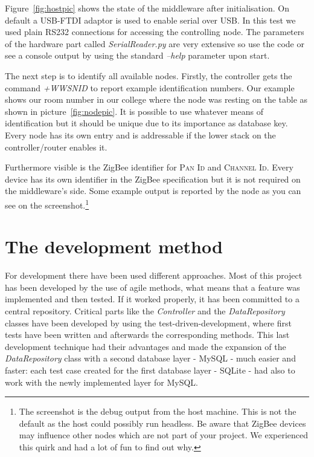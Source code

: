 Figure~\ref{fig:hostpic} shows the state of the middleware after initialisation. On default a USB-FTDI adaptor is used to enable serial over USB.
In this test we used plain RS232 connections for accessing the controlling node. The parameters of the hardware part called \textit{SerialReader.py}
are very extensive so use the code or see a console output by using the standard \textit{--help} parameter upon start.

The next step is to identify all available nodes. Firstly, the controller gets the command \textit{+WWSNID} to report example identification numbers.
Our example shows our room number in our college where the node was resting on the table as shown in picture~\ref{fig:nodepic}. It is possible 
to use whatever means of identification but it should be unique due to its importance as database key. Every node has its own 
entry and is addressable if the lower stack on the controller/router enables it.

Furthermore visible is the ZigBee identifier for \textsc{Pan Id} and \textsc{Channel Id}. Every device has its own identifier in the ZigBee specification
but it is not required on the middleware's side. Some example output is reported by the node as you can see on the screenshot.\footnote{The screenshot
    is the debug output from the host machine. This is not the default as the host could possibly run headless. Be aware that ZigBee devices may influence
other nodes which are not part of your project. We experienced this quirk and had a lot of fun to find out why.}

\newpage
\section{The development method}

For development there have been used different approaches. Most of this project has been developed by the use of agile methods, 
what means that a feature was implemented and then tested. If it worked properly, it has been committed to a central repository. 
Critical parts like the \textit{Controller} and the \textit{DataRepository} classes have been developed by using the test-driven-development, 
where first tests have been written and afterwards the corresponding methods. This last development technique had their advantages and made 
the expansion of the \textit{DataRepository} class with a second database layer - MySQL - much easier and faster: each test case 
created for the first database layer - SQLite - had also to work with the newly implemented layer for MySQL.

